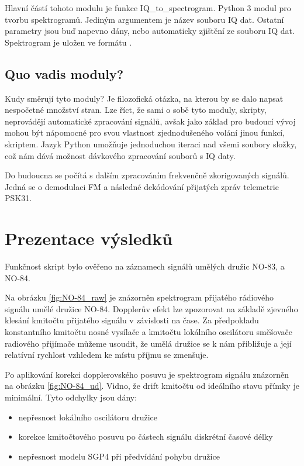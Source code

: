 Hlavní částí tohoto modulu je funkce IQ\_to\_spectrogram.
Python 3 modul pro tvorbu spektrogramů. Jediným argumentem je název souboru IQ dat. Ostatní parametry jsou buď napevno dány, nebo automaticky zjištění ze souboru IQ dat. Spektrogram je uložen ve formátu .

\section{Quo vadis moduly?}

Kudy směrují tyto moduly? Je filozofická otázka, na kterou by se dalo napsat nespočetné množství stran. Lze říct, že sami o sobě tyto moduly, skripty, neprovádějí automatické zpracování signálů, avšak jako základ pro budoucí vývoj mohou být nápomocné pro svou vlastnost zjednodušeného volání jinou funkcí, skriptem. Jazyk Python umožňuje jednoduchou iteraci nad všemi soubory složky, což nám dává možnost dávkového zpracování souborů s IQ daty.

Do budoucna se počítá s dalším zpracováním frekvenčně zkorigovaných signálů. Jedná se o demodulaci FM a následné dekódování přijatých zpráv telemetrie PSK31.


\chapter{Prezentace výsledků}
\label{chap:prez}

Funkčnost skript bylo ověřeno na záznamech signálů umělých družic NO-83, a NO-84.

Na obrázku \ref{fig:NO-84_raw} je znázorněn spektrogram přijatého rádiového signálu umělé družice NO-84. Dopplerův efekt lze zpozorovat na základě zjevného klesání kmitočtu přijatého signálu v závislosti na čase. Za předpokladu konstantního kmitočtu nosné vysílače a kmitočtu lokálního oscilátoru směšovače radiového přijímače můžeme usoudit, že umělá družice se k nám přibližuje a její relatívní rychlost vzhledem ke místu příjmu se zmenšuje.

Po aplikování korekci dopplerovského posuvu je spektrogram signálu znázorněn na obrázku \ref{fig:NO-84_ud}. Vidno, že drift kmitočtu od ideálního stavu přímky je minimální. Tyto odchylky jsou dány:

\begin{itemize}
  \item nepřesnost lokálního oscilátoru družice
  \item korekce kmitočtového posuvu po částech signálu diskrétní časové délky
  \item nepřesnost modelu SGP4 při předvídání pohybu družice
\end{itemize}

